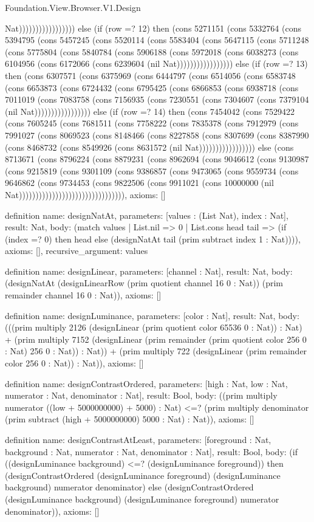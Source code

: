 \begin{lexlean}{Foundation.View.Browser.V1.Design}
\begin{semanticmodule}
{Nat))))))))))))))))) else (if (row =? 12) then (cons 5271151 (cons 5332764 (cons 5394795 (cons 5457245 (cons 5520114 (cons 5583404 (cons 5647115 (cons 5711248 (cons 5775804 (cons 5840784 (cons 5906188 (cons 5972018 (cons 6038273 (cons 6104956 (cons 6172066 (cons 6239604 (nil Nat))))))))))))))))) else (if (row =? 13) then (cons 6307571 (cons 6375969 (cons 6444797 (cons 6514056 (cons 6583748 (cons 6653873 (cons 6724432 (cons 6795425 (cons 6866853 (cons 6938718 (cons 7011019 (cons 7083758 (cons 7156935 (cons 7230551 (cons 7304607 (cons 7379104 (nil Nat))))))))))))))))) else (if (row =? 14) then (cons 7454042 (cons 7529422 (cons 7605245 (cons 7681511 (cons 7758222 (cons 7835378 (cons 7912979 (cons 7991027 (cons 8069523 (cons 8148466 (cons 8227858 (cons 8307699 (cons 8387990 (cons 8468732 (cons 8549926 (cons 8631572 (nil Nat))))))))))))))))) else (cons 8713671 (cons 8796224 (cons 8879231 (cons 8962694 (cons 9046612 (cons 9130987 (cons 9215819 (cons 9301109 (cons 9386857 (cons 9473065 (cons 9559734 (cons 9646862 (cons 9734453 (cons 9822506 (cons 9911021 (cons 10000000 (nil Nat)))))))))))))))))))))))))))))))),
  axioms: []
}

definition{
  name: designNatAt,
  parameters: [values : (List Nat), index : Nat],
  result: Nat,
  body: (match values
    | List.nil => 0
    | List.cons head tail => (if (index =? 0) then head else (designNatAt tail (prim subtract index 1 : Nat)))),
  axioms: [],
  recursive_argument: values
}

definition{
  name: designLinear,
  parameters: [channel : Nat],
  result: Nat,
  body: (designNatAt (designLinearRow (prim quotient channel 16 0 : Nat)) (prim remainder channel 16 0 : Nat)),
  axioms: []
}

definition{
  name: designLuminance,
  parameters: [color : Nat],
  result: Nat,
  body: (((prim multiply 2126 (designLinear (prim quotient color 65536 0 : Nat)) : Nat) + (prim multiply 7152 (designLinear (prim remainder (prim quotient color 256 0 : Nat) 256 0 : Nat)) : Nat)) + (prim multiply 722 (designLinear (prim remainder color 256 0 : Nat)) : Nat)),
  axioms: []
}

definition{
  name: designContrastOrdered,
  parameters: [high : Nat, low : Nat, numerator : Nat, denominator : Nat],
  result: Bool,
  body: ((prim multiply numerator ((low + 5000000000) + 5000) : Nat) <=? (prim multiply denominator (prim subtract (high + 5000000000) 5000 : Nat) : Nat)),
  axioms: []
}

definition{
  name: designContrastAtLeast,
  parameters: [foreground : Nat, background : Nat, numerator : Nat, denominator : Nat],
  result: Bool,
  body: (if ((designLuminance background) <=? (designLuminance foreground)) then (designContrastOrdered (designLuminance foreground) (designLuminance background) numerator denominator) else (designContrastOrdered (designLuminance background) (designLuminance foreground) numerator denominator)),
  axioms: []
}


\end{semanticmodule}
\end{lexlean}
